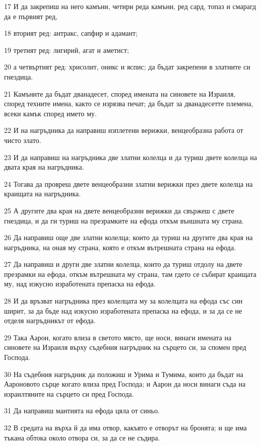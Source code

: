 \par 17 И да закрепиш на него камъни, четири реда камъни, ред сард, топаз и смарагд да е първият ред,
\par 18 вторият ред: антракс, сапфир и адамант;
\par 19 третият ред: лигирий, агат и аметист;
\par 20 а четвъртият ред: хрисолит, оникс и яспис; да бъдат закрепени в златните си гнездица.
\par 21 Камъните да бъдат дванадесет, според имената на синовете на Израиля, според техните имена, както се изрязва печат; да бъдат за дванадесетте племена, всеки камък според името му.
\par 22 И на нагръдника да направиш изплетени верижки, венцеобразна работа от чисто злато.
\par 23 И да направиш на нагръдника две златни колелца и да туриш двете колелца на двата края на нагръдника.
\par 24 Тогава да провреш двете венцеобразни златни верижки през двете колелца на краищата на нагръдника.
\par 25 А другите два края на двете венцеобразни верижки да свържеш с двете гнездица, и да ги туриш на презрамките на ефода откъм външната му страна.
\par 26 Да направиш още две златни колелца; които да туриш на другите два края на нагръдника, на оная му страна, която е откъм вътрешната страна на ефода.
\par 27 Да направиш и други две златни колелца, които да туриш отдолу на двете презрамки на ефода, откъм вътрешната му страна, там гдето се събират краищата му, над изкусно изработената препаска на ефода.
\par 28 И да връзват нагръдника през колелцата му за колелцата на ефода със син ширит, за да бъде над изкусно изработената препаска на ефода, и за да се не отделя нагръдникът от ефода.
\par 29 Така Аарон, когато влиза в светото място, ще носи, винаги имената на синовете на Израиля върху съдебния нагръдник на сърцето си, за спомен пред Господа.
\par 30 На съдебния нагръдник да положиш и Урима и Тумима, които да бъдат на Аароновото сърце когато влиза пред Господа; и Аарон да носи винаги съда на израилтяните на сърцето си пред Господа.
\par 31 Да направиш мантията на ефода цяла от синьо.
\par 32 В средата на върха й да има отвор, какъвто е отворът на бронята; и ще има тъкана обтока около отвора си, за да се не съдира.
